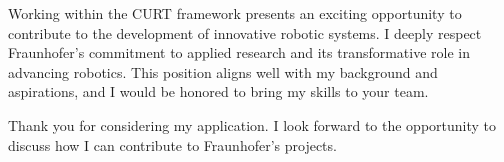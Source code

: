 \documentclass[11pt,a4paper,skipsamekey]{moderncv}
\begin{document}
\par
Working within the CURT framework presents an exciting opportunity to contribute to the development of innovative robotic systems.
I deeply respect Fraunhofer's commitment to applied research and its transformative role in advancing robotics.
This position aligns well with my background and aspirations, and I would be honored to bring my skills to your team.

\par
Thank you for considering my application.
I look forward to the opportunity to discuss how I can contribute to Fraunhofer's projects.

\begin{comment}
	\par
	I am excited to apply for the Software Engineer position for Professional Outdoor Service Robots (Req. Num. 74030) at Fraunhofer.  
	My asperation is to grow into a software architect, and this role offers a clear path by contributing to the cutting-edge robotics developed by Fraunhofer.  
	Over the past year, I have completed two software projects that demonstrate my ability to design scalable architectures, and I am eager to bring this experience to your robotics ecosystem.  
	
	\par
	I enhanced the ros2\_whisper open-source project by adding live transcription capabilities.  
	This involved restructuring the usage of Whisper.cpp (OpenAI's speach-to-text-model in c++), to enable both context preservation and frequent updates.  
	A threaded post-processing node was then added to align and merge the text, resulting in robust performance and efficiency.  
	Skills directly applicable to maintaining the reliability of the CURT ecosystem.  
	
	\par
	I designed a pipeline for deploying multiple Hugging Face models on a live camera feed, mapping model outputs to a unified label framework.  
	The extendable architecture supports on-avaiable visualization of bounding boxes and pixel masks, as demonstrated by simultaneously running DETR and Maskformer models.  
	This project highlights my ability to integrate complex systems—a core requirement for Fraunhofer's professional service robots.  
	
	\par
	I am well-prepared to manage Continuous Integration (CI) tasks, drawing on over 10 years of using Linux (Ubuntu) as my primary development environment.  
	My prior role in embedded systems gives me experience collaborating with interdisciplinary teams of engineers and physicists.  
	Additionally, as a second author on a publication in Personalized Robot Navigation, I contributed to advancements in autonomous navigation, including generating simulation-based training data and real-world deployment.  
	

\end{comment}
\end{document}
